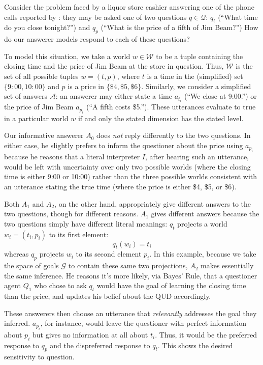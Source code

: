 \documentclass[12pt, floatsintext, jou]{apa6}
\begin{document}
Consider the problem faced by a liquor store cashier answering one of the phone calls reported by : they may be asked one of two questions $q \in \mathcal{Q}$: $q_t$ (``What time do you close tonight?'') and $q_p$ (``What is the price of a fifth of Jim Beam?'') How do our answerer models respond to each of these questions?

To model this situation, we take a world $w \in \mathcal{W}$ to be a tuple containing the closing time and the price of Jim Beam at the store in question. Thus, $\mathcal{W}$ is the set of all possible tuples $w = (t, p)$, where $t$ is a time in the (simplified) set $\{9:00, 10:00\}$ and $p$ is a price in $\{\$4, \$5, \$6\}$. Similarly, we consider a simplified set of answers $\mathcal{A}$: an answerer may either state a time $a_{t_i}$ (``We close at 9:00.'') or the price of Jim Beam $a_{p_i}$  (``A fifth costs \$5.''). These utterances evaluate to true in a particular world $w$ if and only the stated dimension has the stated level.

Our informative answerer $A_0$ does \emph{not} reply differently to the two questions. In either case, he slightly prefers to inform the questioner about the price using $a_{p_i}$ because he reasons that a literal interpreter $I$, after hearing such an utterance, would be left with uncertainty over only two possible worlds (where the closing time is either 9:00 or 10:00) rather than the three possible worlds consistent with an utterance stating the true time (where the price is either \$4, \$5, or \$6).

Both $A_1$ and $A_2$, on the other hand, appropriately give different answers to the two questions, though for different reasons. $A_1$ gives different answers because the two questions simply have different literal meanings: $q_t$ projects a world $w_i = (t_i, p_i)$ to its first element:$$q_t(w_i) = t_i$$ whereas $q_p$ projects $w_i$ to its second element $p_i$. In this example, because we take the space of goals $\mathcal{G}$ to contain these same two projections, $A_2$ makes essentially the same inference. He reasons it's more likely, via Bayes' Rule, that a questioner agent $Q_1$ who chose to ask $q_t$ would have the goal of learning the closing time than the price, and updates his belief about the QUD accordingly.

These answerers then choose an utterance that \emph{relevantly} addresses the goal they inferred. $a_{p_i}$, for instance, would leave the questioner with perfect information about $p_i$ but gives no information at all about $t_i$. Thus, it would be the preferred response to $q_p$ and the dispreferred response to $q_t$. This shows the desired sensitivity to question.
\end{document}
